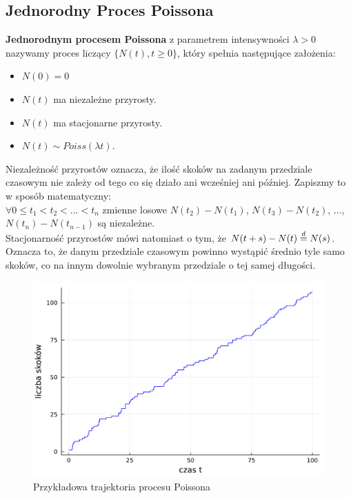 \documentclass{article}
\theoremstyle{break}
\numberwithin{equation}{subsection}
\numberwithin{figure}{section}
\begin{document}
\subsection{Jednorodny Proces Poissona}

\textbf{Jednorodnym procesem Poissona} z parametrem intensywności $\lambda > 0$ nazywamy proces liczący $\{N(t), t\ge0\}$, który spełnia następujące założenia:
\begin{itemize}
\item $N(0) = 0$
\item $N(t)$ ma niezależne przyrosty.
\item $N(t)$ ma stacjonarne przyrosty.
\item $N(t) \sim Poiss(\lambda t).$
\end{itemize}

Niezależność przyrostów oznacza, że ilość skoków na zadanym przedziale czasowym nie zależy od tego co się działo ani wcześniej ani później. Zapiszmy to w sposób matematyczny:\\
 $\forall{0\le t_1<t_2<...<t_n}$ zmienne losowe $N(t_2)- N(t_1)$, $N(t_3)-N(t_2)$, ...,~ $N(t_n)- N(t_{n-1})$ są niezależne.\\
Stacjonarność przyrostów mówi natomiast o tym, że $N(t+s)-N(t)\buildrel d \over = N(s)$. Oznacza to, że danym przedziale czasowym powinno wystąpić średnio tyle samo skoków, co na innym dowolnie wybranym przedziale o tej samej długości.

\begin{figure}[H]
	\center
	\includegraphics[scale=0.35]{trajektoria_poissona.pdf}
	\caption{Przykładowa trajektoria procesu Poissona}
	\label{fig: 1}
\end{figure}
\end{document}
